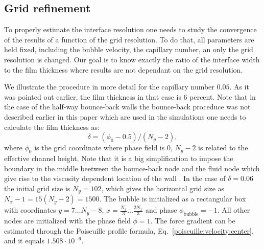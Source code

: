 \documentclass{article}
\newcommand{\todo}[1]{{\color{red}#1}}
\begin{document}
\subsection{Grid refinement}
To properly estimate the interface resolution one needs to study the convergence
of the results of a function of the grid resolution. To do that, all parameters are held fixed,
including the bubble velocity, the capillary number, an only the grid
resolution is changed. Our goal is to know exactly the ratio of the interface width to the
film thickness where results are not dependant on the grid resolution.

We illustrate the procedure in more detail for the capillary number
$0.05$. As it was pointed out earlier, the film thickness in that case is $6$ percent.
Note that in the case of the half-way bounce-back walls \todo{the bounce-back
proceduce was not described earlier in this paper} which are used in the
simulations one needs to calculate the film thickness as:
\begin{equation}
\delta=(\phi_0-0.5)/(N_y-2),
\end{equation}
where $\phi_0$ is the grid coordinate where phase field is $0$, $N_y-2$
is related to the effective channel height. Note that it is a big
simplification to impose the boundary in the middle beetween the bounce-back
node and the fluid node which give rise to the viscosity dependent location of
the wall \cite{ginzburg-multireflection}. In the case of $\delta=0.06$ the
initial grid size is $N_y=102$, which gives the horizontal grid size as $N_x-1=15(N_y-2)=1500$.
The bubble is initialized as a rectangular box with coordinates
$y=7\dots N_y-8$, $x=\frac{N_x}{3}\dots \frac{2 N_x}{3}$ and phase
$\phi_{\mathrm{bubble}}=-1$. All other nodes are initialized with the phase field
$\phi=1$. The force gradient can be estimated through the Poiseuille
profile formula, Eq.~\ref{poiseuille:velocity:center}, and it equals
$1.508 \cdot 10^{-6}$.
\end{document}
